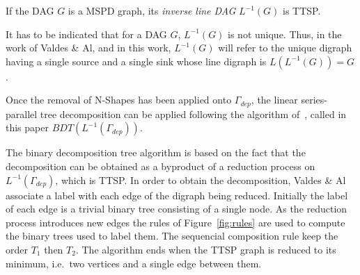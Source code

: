\begin{myth}
If the DAG $G$ is a MSPD graph, its \emph{inverse line DAG} $L^{-1}(G)$ is TTSP.
\end{myth}

It has to be indicated that for a DAG $G$, $L^{-1}(G)$ is not unique. Thus, in the work of Valdes \& Al, and in this work, $L^{-1}(G)$ will refer to the unique digraph having a single source and a single sink whose line digraph is $L(L^{-1}(G))=G$.

Once the removal of N-Shapes has been applied onto $\Gamma_{dep}$, the linear series-parallel tree decomposition can be applied following the algorithm of~\cite{Valdes:1979:RSP:800135.804393}, called in this paper $BDT(L^{-1}(\Gamma_{dep}))$.

The binary decomposition tree algorithm is based on the fact that the decomposition can be obtained as a byproduct of a reduction process on $L^{-1}(\Gamma_{dep})$, which is TTSP. In order to obtain the decomposition, Valdes \& Al associate a label with each edge of the digraph being reduced. Initially the label of each edge is a trivial binary tree consisting of a single node. As the reduction process introduces new edges the rules of Figure~\ref{fig:rules} are used to compute the binary trees used to label them. The sequencial composition rule keep the order $T_1$ then $T_2$. The algorithm ends when the TTSP graph is reduced to its minimum, i.e.\ two vertices and a single edge between them.

